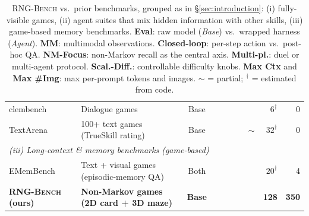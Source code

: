 \documentclass{llmxive}
\providecommand{\benchname}{\textsc{RNG-Bench}\xspace}
\providecommand{\cmark}{\ding{51}}
\providecommand{\xmark}{\ding{55}}
\providecommand{\pmark}{$\boldsymbol{\sim}$}
\begin{document}
\begin{table}[tbp]
{\begin{tabular}{l l c c c c c c r r}
clembench~\citep{chalamalasetti2023clembench} & Dialogue games                                & Base  & \xmark & \cmark & \xmark & \cmark & \cmark & $6^\dagger$  & 0 \\
TextArena~\citep{guertler2025textarena}     & 100+ text games (TrueSkill rating)              & Base  & \xmark & \cmark & \xmark & \cmark & \pmark & $32^\dagger$ & 0 \\
\midrule
\multicolumn{10}{l}{\emph{(iii) Long-context \& memory benchmarks (game-based)}} \\
EMemBench~\citep{li2026emembench}           & Text + visual games (episodic-memory QA)        & Both  & \cmark & \xmark & \xmark & \xmark & \xmark & $20^\dagger$ & 4 \\
\midrule
\rowcolor{gray!12}
\textbf{\benchname{} (ours)} & \textbf{Non-Markov games (2D card + 3D maze)} & \textbf{Base} & \cmark & \cmark & \cmark & \cmark & \cmark & \textbf{128} & \textbf{350} \\
\bottomrule
\end{tabular}%
}
\caption{\benchname{} vs.\ prior benchmarks, grouped as in §\ref{sec:introduction}: (i) fully-visible games, (ii) agent suites that mix hidden information with other skills, (iii) game-based memory benchmarks. \textbf{Eval}: raw model (\emph{Base}) vs.\ wrapped harness (\emph{Agent}). \textbf{MM}: multimodal observations. \textbf{Closed-loop}: per-step action vs.\ post-hoc QA. \textbf{NM-Focus}: non-Markov recall as the central axis. \textbf{Multi-pl.}: duel or multi-agent protocol. \textbf{Scal.-Diff.}: controllable difficulty knobs. \textbf{Max Ctx} and \textbf{Max \#Img}: max per-prompt tokens and images. $\sim$ = partial; $^\dagger$ = estimated from code.}
\label{tab:bench_compare}
\end{table}
\end{document}
